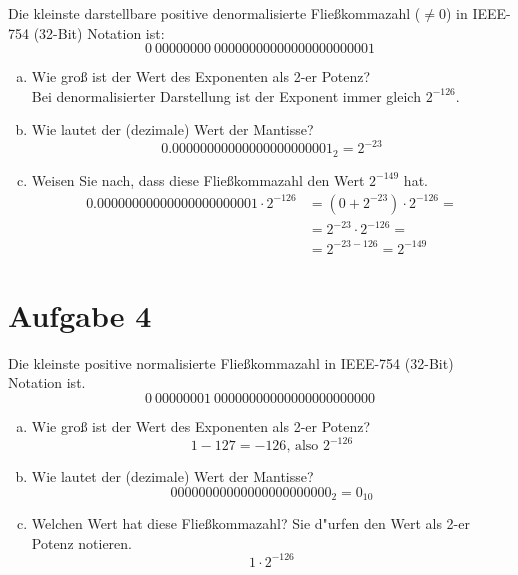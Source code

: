 \documentclass[10pt, oneside]{article}
\begin{document}
Die kleinste darstellbare positive denormalisierte Flie{\ss}kommazahl ($\neq
0$) in IEEE-754 (32-Bit) Notation ist:
\begin{equation*}
    0\ 00000000\ 00000000000000000000001
\end{equation*}
\begin{enumerate}[(a)]
    \item Wie gro{\ss} ist der Wert des Exponenten als 2-er Potenz? \\
        Bei denormalisierter Darstellung ist der Exponent immer gleich $2^{-126}$.
    \item Wie lautet der (dezimale) Wert der Mantisse?
        \begin{equation*}
            0.00000000000000000000001_2 = 2^{-23}
        \end{equation*}
    \item Weisen Sie nach, dass diese Flie{\ss}kommazahl den Wert $2^{-149}$ hat.
        \begin{align*}
            0.00000000000000000000001 \cdot 2^{-126} &= (0 + 2^{-23}) \cdot 2^{-126} = \\
                                                     &= 2^{-23} \cdot 2^{-126} = \\
                                                     &= 2^{-23 - 126} = 2^{-149}
        \end{align*}
\end{enumerate}

\section{Aufgabe 4}

Die kleinste positive normalisierte Flie{\ss}kommazahl in IEEE-754 (32-Bit) Notation ist.
\begin{equation*}
    0\ 00000001\ 00000000000000000000000
\end{equation*}
\begin{enumerate}[(a)]
    \item Wie gro{\ss} ist der Wert des Exponenten als 2-er Potenz?
        \begin{equation*}
            1 - 127 = -126 \text{, also  } 2^{-126}
        \end{equation*}
    \item Wie lautet der (dezimale) Wert der Mantisse?
        \begin{equation*}
            00000000000000000000000_2 = 0_{10}
        \end{equation*}
    \item Welchen Wert hat diese Flie{\ss}kommazahl? Sie d"urfen den Wert als
        2-er Potenz notieren.
        \begin{equation*}
            1 \cdot 2^{-126}
        \end{equation*}
\end{enumerate}
\end{document}
